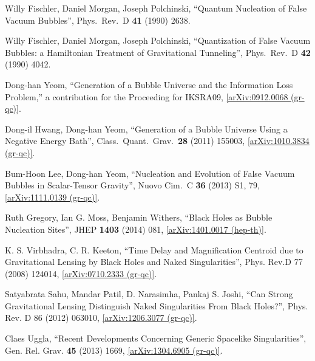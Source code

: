 \documentclass[12pt]{article}
\newcommand{\2}{$^2$}
\newcommand{\3}{$^3$}
\newcommand{\4}{$_4$}
\newcommand{\5}{$_5$}
\begin{document}
\begin{thebibliography}{400}
  Willy Fischler, Daniel Morgan, Joseph Polchinski, 
	``Quantum Nucleation of False Vacuum Bubbles'',
  Phys.\ Rev.\  D {\bf 41} (1990) 2638.
	
   Willy Fischler, Daniel Morgan, Joseph Polchinski, 
  ``Quantization of False Vacuum Bubbles: a Hamiltonian Treatment of Gravitational Tunneling'',
  Phys.\ Rev.\  D {\bf 42} (1990) 4042.
	


  Dong-han Yeom,
  ``Generation of a Bubble Universe and the Information Loss Problem,'' a contribution for the Proceeding for IKSRA09, 
  \href{http://arxiv.org/abs/0912.0068}{[arXiv:0912.0068 (gr-qc)]}.
 
Dong-il Hwang, Dong-han Yeom,
  ``Generation of a Bubble Universe Using a Negative Energy Bath'',
  Class.\ Quant.\ Grav.\  {\bf 28} (2011) 155003,
  \href{http://arxiv.org/abs/1010.3834}{[arXiv:1010.3834 (gr-qc)]}.

Bum-Hoon Lee, Dong-han Yeom,
  ``Nucleation and Evolution of False Vacuum Bubbles in Scalar-Tensor Gravity'',
  Nuovo Cim.\ C {\bf 36} (2013) S1, 79, \href{http://arxiv.org/abs/1111.0139}{[arXiv:1111.0139 (gr-qc)]}.
	


Ruth Gregory, Ian G. Moss, Benjamin Withers,
``Black Holes as Bubble Nucleation Sites'', JHEP \textbf{1403} (2014) 081, \href{http://arxiv.org/abs/1401.0017}{[arXiv:1401.0017 (hep-th)]}.


K. S. Virbhadra, C. R. Keeton, ``Time Delay and Magnification Centroid due to Gravitational Lensing by Black Holes and Naked Singularities'', Phys. Rev.D 77 (2008) 124014, \href{http://arxiv.org/abs/0710.2333}{[arXiv:0710.2333 (gr-qc)]}.

Satyabrata Sahu, Mandar Patil, D. Narasimha, Pankaj S. Joshi,
``Can Strong Gravitational Lensing Distinguish Naked Singularities From Black Holes?'', Phys. Rev. D 86 (2012) 063010,
\href{http://arxiv.org/abs/1206.3077}{[arXiv:1206.3077 (gr-qc)]}.

Claes Uggla, ``Recent Developments Concerning Generic Spacelike Singularities'', Gen. Rel. Grav. \textbf{45} (2013) 1669, \href{http://arxiv.org/abs/1304.6905}{[arXiv:1304.6905 (gr-qc)]}.



\end{thebibliography}
\end{document}
